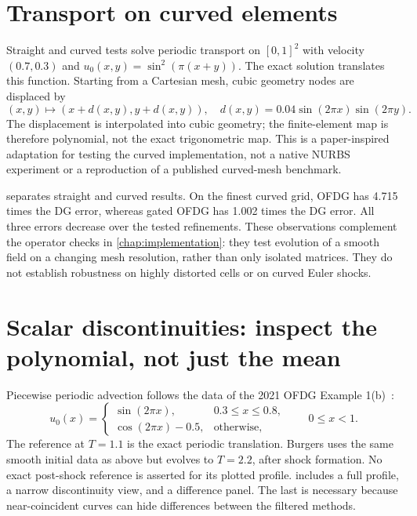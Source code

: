 \section{Transport on curved elements}
Straight and curved tests solve periodic transport on $[0,1]^2$ with velocity
$(0.7,0.3)$ and $u_0(x,y)=\sin^2(\pi(x+y))$. The exact solution translates this
function. Starting from a Cartesian mesh, cubic geometry nodes are displaced by
\begin{equation}
 (x,y)\longmapsto(x+d(x,y),y+d(x,y)),\quad
 d(x,y)=0.04\sin(2\pi x)\sin(2\pi y).
\end{equation}
The displacement is interpolated into cubic geometry; the finite-element map
is therefore polynomial, not the exact trigonometric map. This is a
paper-inspired adaptation for testing the curved implementation, not a native
NURBS experiment or a reproduction of a published curved-mesh benchmark.

 separates straight and curved results. On the finest
curved grid, OFDG has 4.715 times the DG error, whereas gated OFDG has 1.002
times the DG error. All three errors decrease over the tested refinements.
These observations complement the operator checks in
\cref{chap:implementation}: they test evolution of a smooth field on a changing
mesh resolution, rather than only isolated matrices. They do not establish
robustness on highly distorted cells or on curved Euler shocks.

\section{Scalar discontinuities: inspect the polynomial, not just the mean}
Piecewise periodic advection follows the data of the 2021 OFDG Example 1(b)~\cite{LuEtAl2021}:
\begin{equation}
 u_0(x)=\begin{cases}
 \sin(2\pi x),&0.3\leq x\leq0.8,\\
 \cos(2\pi x)-0.5,&\text{otherwise},
 \end{cases}\qquad 0\leq x<1.
\end{equation}
The reference at $T=1.1$ is the exact periodic translation. Burgers uses the
same smooth initial data as above but evolves to $T=2.2$, after shock formation.
No exact post-shock reference is asserted for its plotted profile.
 includes a full profile, a narrow discontinuity view,
and a difference panel. The last is necessary because near-coincident curves
can hide differences between the filtered methods.

